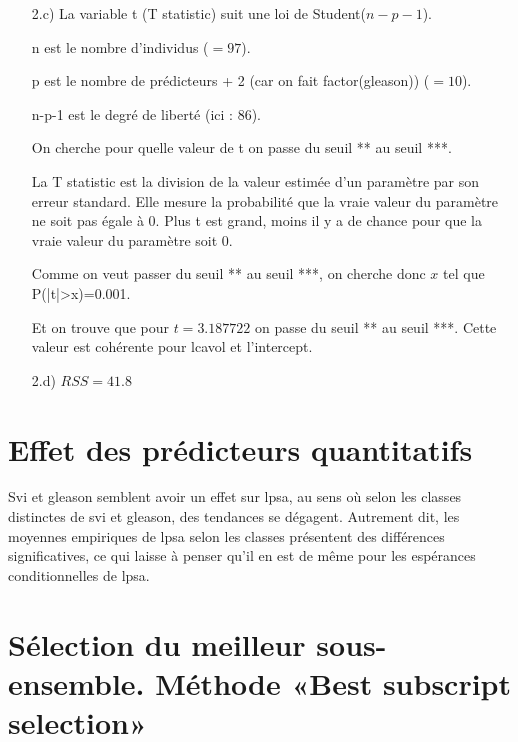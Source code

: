 \documentclass[a4paper, 12pt]{article}
\begin{document}
\begin{enumerate}
\item[2.c)] La variable t (T statistic) suit une loi de Student($n-p-1$).

n est le nombre d'individus ($=97$).
 
p est le nombre de prédicteurs + 2 (car on fait factor(gleason)) ($=10$).

n-p-1 est le degré de liberté (ici : $86$).

On cherche pour quelle valeur de t on passe du seuil ** au seuil ***.

La T statistic est la division de la valeur estimée d'un paramètre par son erreur standard. Elle mesure la probabilité que la vraie valeur du paramètre ne soit pas égale à $0$. Plus t est grand, moins il y a de chance pour que la vraie valeur du paramètre soit $0$.

Comme on veut passer du seuil ** au seuil ***, on cherche donc $x$ tel que P(|t|>x)=0.001.

Et on trouve que pour $t=3.187722$ on passe du seuil ** au seuil ***. Cette valeur est cohérente pour lcavol et l'intercept.

\item[2.d)] $RSS = 41.8$ 

\end{enumerate}

\section{Effet des prédicteurs quantitatifs}

Svi et gleason semblent avoir un effet sur lpsa, au sens où selon les classes distinctes de svi et gleason, des tendances se dégagent. Autrement dit, les moyennes empiriques de lpsa selon les classes présentent des différences significatives, ce qui laisse à penser qu'il en est de même pour les espérances conditionnelles de lpsa.


\section{Sélection du meilleur sous-ensemble. Méthode «Best subscript selection»}
\end{document}
